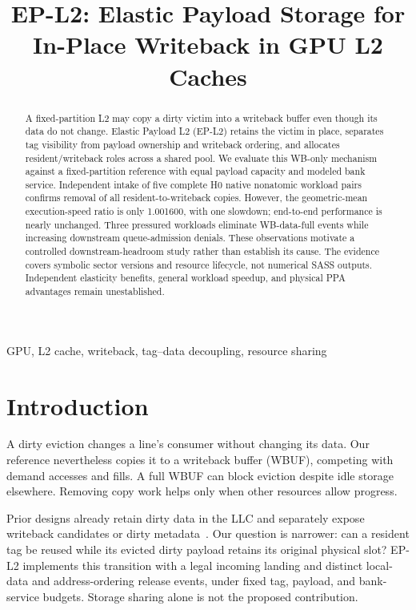 \documentclass[conference,letterpaper]{IEEEtran}
\newcommand{\epl}{EP-L2}
\begin{document}
\title{EP-L2: Elastic Payload Storage for\\In-Place Writeback in GPU L2 Caches}
\author{}
\maketitle
\begin{abstract}
A fixed-partition L2 may copy a dirty victim into a writeback buffer even though its data do not change. Elastic Payload L2 (EP-L2) retains the victim in place, separates tag visibility from payload ownership and writeback ordering, and allocates resident/writeback roles across a shared pool. We evaluate this WB-only mechanism against a fixed-partition reference with equal payload capacity and modeled bank service. Independent intake of five complete H0 native nonatomic workload pairs confirms removal of all resident-to-writeback copies. However, the geometric-mean execution-speed ratio is only 1.001600, with one slowdown; end-to-end performance is nearly unchanged. Three pressured workloads eliminate WB-data-full events while increasing downstream queue-admission denials. These observations motivate a controlled downstream-headroom study rather than establish its cause. The evidence covers symbolic sector versions and resource lifecycle, not numerical SASS outputs. Independent elasticity benefits, general workload speedup, and physical PPA advantages remain unestablished.
\end{abstract}
\begin{IEEEkeywords}
GPU, L2 cache, writeback, tag--data decoupling, resource sharing
\end{IEEEkeywords}

\section{Introduction}
A dirty eviction changes a line's consumer without changing its data. Our reference nevertheless copies it to a writeback buffer (WBUF), competing with demand accesses and fills. A full WBUF can block eviction despite idle storage elsewhere. Removing copy work helps only when other resources allow progress.

Prior designs already retain dirty data in the LLC and separately expose writeback candidates or dirty metadata~\cite{vwq,lastwrite,dbi}. Our question is narrower: can a resident tag be reused while its evicted dirty payload retains its original physical slot? \epl{} implements this transition with a legal incoming landing and distinct local-data and address-ordering release events, under fixed tag, payload, and bank-service budgets. Storage sharing alone is not the proposed contribution.
\end{document}
